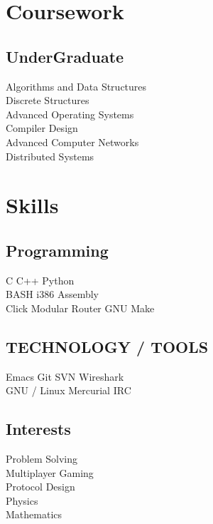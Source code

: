 \documentclass[letterpaper]{deedy-resume-openfont} %
\begin{document}
\begin{minipage}[t]{0.33\textwidth}
\section{Coursework}
\subsection{UnderGraduate}
Algorithms and Data Structures \\
Discrete Structures \\
Advanced Operating Systems \\
Compiler Design \\
Advanced Computer Networks \\
Distributed Systems \\
\sectionsep %
\section{Skills}
\subsection{Programming}
C \textbullet{} C++ \textbullet{} Python \\
BASH \textbullet{} i386 Assembly \\
Click Modular Router  \textbullet{} GNU Make \\
\sectionsep %
\subsection{TECHNOLOGY / TOOLS}
Emacs \textbullet{} Git \textbullet{} SVN  \textbullet{} Wireshark \\
GNU / Linux \textbullet{} Mercurial \textbullet{}
IRC \textbullet{}  
\sectionsep %
\subsection{Interests}
Problem Solving \\
Multiplayer Gaming \\
Protocol Design \\
Physics \\
Mathematics \\
\sectionsep %

\end{minipage} %
\end{document}
